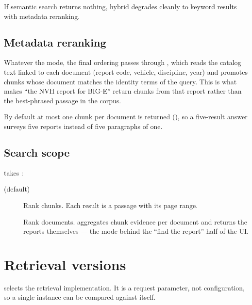 If semantic search returns nothing, hybrid degrades cleanly to keyword results
with metadata reranking.

\subsection{Metadata reranking}

Whatever the mode, the final ordering passes through
, which reads the catalog text linked to each
document (report code, vehicle, discipline, year) and promotes chunks whose
document matches the identity terms of the query. This is what makes ``the NVH
report for BIG-E'' return chunks from that report rather than the best-phrased
passage in the corpus.

By default at most one chunk per document is returned
(), so a five-result answer surveys five
reports instead of five paragraphs of one.

\subsection{Search scope}

 takes :

\begin{description}
\item[ (default)] Rank chunks. Each result is a passage with its
page range.
\item[] Rank documents.  aggregates chunk
evidence per document and returns the reports themselves --- the mode behind the
``find the report'' half of the UI.
\end{description}

\section{Retrieval versions}

 selects the retrieval implementation. It is a request
parameter, not configuration, so a single instance can be compared against
itself.

